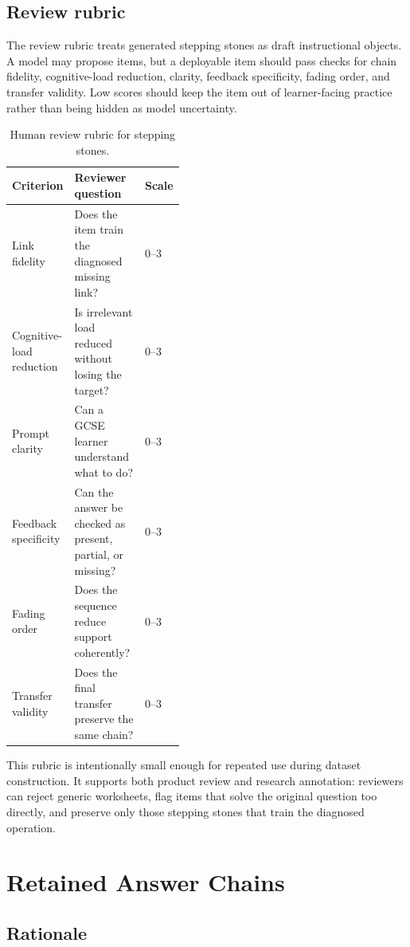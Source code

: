 \documentclass[11pt]{article}
\begin{document}
\subsection{Review rubric}

The review rubric treats generated stepping stones as draft instructional objects. A model may propose items, but a deployable item should pass checks for chain fidelity, cognitive-load reduction, clarity, feedback specificity, fading order, and transfer validity. Low scores should keep the item out of learner-facing practice rather than being hidden as model uncertainty.

\begin{table}[H]
\centering
\small
\begin{tabularx}{\linewidth}{L{0.27\linewidth}Y L{0.16\linewidth}}
\toprule
\textbf{Criterion} & \textbf{Reviewer question} & \textbf{Scale}\\
\midrule
Link fidelity & Does the item train the diagnosed missing link? & 0--3\\
Cognitive-load reduction & Is irrelevant load reduced without losing the target? & 0--3\\
Prompt clarity & Can a GCSE learner understand what to do? & 0--3\\
Feedback specificity & Can the answer be checked as present, partial, or missing? & 0--3\\
Fading order & Does the sequence reduce support coherently? & 0--3\\
Transfer validity & Does the final transfer preserve the same chain? & 0--3\\
\bottomrule
\end{tabularx}
\caption{Human review rubric for stepping stones.}
\label{tab:stonerubric}
\end{table}

This rubric is intentionally small enough for repeated use during dataset construction. It supports both product review and research annotation: reviewers can reject generic worksheets, flag items that solve the original question too directly, and preserve only those stepping stones that train the diagnosed operation.

\section{Retained Answer Chains}

\subsection{Rationale}
\end{document}
